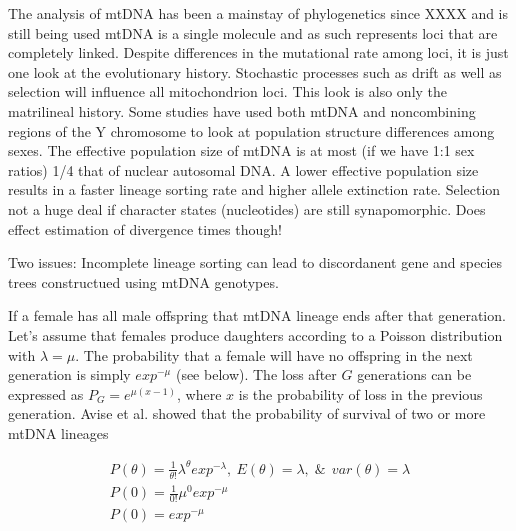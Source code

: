 \documentclass{report}\usepackage[]{graphicx}\usepackage[]{color}
\begin{document}
The analysis of mtDNA has been a mainstay of phylogenetics since XXXX and is still being used 
mtDNA is a single molecule and as such represents loci that are completely linked. 
Despite differences in the mutational rate among loci, it is just one look 
at the evolutionary history. Stochastic processes such as drift as well as selection will influence all mitochondrion
loci. This look is also only the matrilineal history. Some studies have used both mtDNA
and noncombining regions of the Y chromosome to look at population structure differences 
among sexes. The effective
population size of mtDNA is at most (if we have 1:1 sex ratios) 1/4 that of nuclear autosomal DNA. A lower 
effective population size results in a faster lineage sorting rate and higher allele 
extinction rate. %
Selection not a huge deal if character states (nucleotides) are still synapomorphic. Does effect estimation 
of divergence times though!


Two issues:
Incomplete lineage sorting can lead to discordanent gene and species trees constructued using mtDNA genotypes. 

If a female has all male offspring that mtDNA lineage ends after that generation. Let's assume that females produce daughters
according to a Poisson distribution with $\lambda = \mu$. The probability that a female will have no offspring in the next generation
is simply $exp^{-\mu}$ (see below). The loss after $G$ generations can be expressed as $P_G = e^{\mu(x-1)}$, where $x$ is the 
probability of loss in the previous generation. Avise et al. showed that the probability of survival of two or more mtDNA lineages

\begin{gather}
  P(\theta)=\frac{1}{\theta!}\lambda^\theta exp^{-\lambda}, \ E(\theta)=\lambda ,\; \&\,\; var(\theta)=\lambda \\
 P(0)=\frac{1}{0!}\mu^0 exp^{-\mu} \\
 P(0)= exp^{-\mu}
\end{gather}
\end{document}
